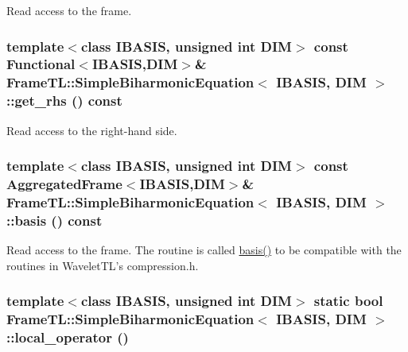 Read access to the frame. \hypertarget{classFrameTL_1_1SimpleBiharmonicEquation_37ff3b226a0d77e00319bab67159632b}{
\subsubsection[get\_\-rhs]{\setlength{\rightskip}{0pt plus 5cm}template$<$class IBASIS, unsigned int DIM$>$ const {\bf Functional}$<$IBASIS,DIM$>$\& {\bf FrameTL::SimpleBiharmonicEquation}$<$ IBASIS, DIM $>$::get\_\-rhs () const}}
\label{classFrameTL_1_1SimpleBiharmonicEquation_37ff3b226a0d77e00319bab67159632b}


Read access to the right-hand side. \hypertarget{classFrameTL_1_1SimpleBiharmonicEquation_27aa32bf09583eaccb85c02a83ace799}{
\subsubsection[basis]{\setlength{\rightskip}{0pt plus 5cm}template$<$class IBASIS, unsigned int DIM$>$ const {\bf AggregatedFrame}$<$IBASIS,DIM$>$\& {\bf FrameTL::SimpleBiharmonicEquation}$<$ IBASIS, DIM $>$::basis () const}}
\label{classFrameTL_1_1SimpleBiharmonicEquation_27aa32bf09583eaccb85c02a83ace799}


Read access to the frame. The routine is called \hyperlink{classFrameTL_1_1SimpleBiharmonicEquation_27aa32bf09583eaccb85c02a83ace799}{basis()} to be compatible with the routines in WaveletTL's compression.h. \hypertarget{classFrameTL_1_1SimpleBiharmonicEquation_24c6d03c5657afb6a6758c55278a33d3}{
\subsubsection[local\_\-operator]{\setlength{\rightskip}{0pt plus 5cm}template$<$class IBASIS, unsigned int DIM$>$ static bool {\bf FrameTL::SimpleBiharmonicEquation}$<$ IBASIS, DIM $>$::local\_\-operator ()}}
\label{classFrameTL_1_1SimpleBiharmonicEquation_24c6d03c5657afb6a6758c55278a33d3}



